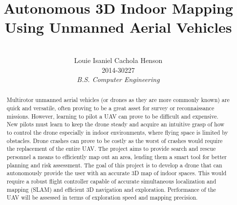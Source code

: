 \documentclass[english]{upeeei}
\begin{document}
\title{Autonomous 3D Indoor Mapping Using Unmanned Aerial Vehicles} 


\author{
\\Louie Isaniel Cachola Henson \\ 2014-30227 \\ \emph{B.S. Computer Engineering}
}




\maketitle
\begin{abstract} 

Multirotor unmanned aerial vehicles (or drones as they are more commonly known) are quick and versatile, often 
proving to be a great asset for survey or reconnaissance missions.
However, learning to pilot a UAV can prove to be 
difficult and expensive. New pilots must learn to keep the drone steady and acquire an intuitive grasp of how to
control the drone especially in indoor environments, where flying space is limited by obstacles. Drone crashes
can prove to be costly as the worst of crashes would require the replacement of the entire UAV.
The project aims to provide search and rescue
personnel a means to efficiently map out an area, lending them a smart tool for better planning and risk assessment.
The goal of this project is to develop a drone that can autonomously provide the user with an
accurate 3D map of indoor spaces. This would require a robust flight controller capable of
accurate simultaneous localization and mapping (SLAM) and efficient 3D navigation and exploration. Performance of the UAV
will be assessed in terms of exploration speed and mapping precision.

\end{abstract}
\end{document}
